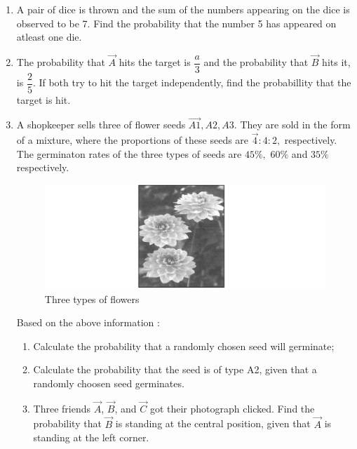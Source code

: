 \begin{enumerate}
\item A pair of dice is thrown and the sum of the numbers appearing on the dice is observed to be 7. Find the probability that the number 5 has appeared on atleast one die.
\item The probability that $\vec{A}$ hits the target is $\dfrac{a}{3}$ and the probability that $\vec{B}$ hits it, is $\dfrac{2}{5}.$ If both try to hit the target independently, find the probabillity that the target is hit. 
\item A shopkeeper sells three of flower seeds $\vec{A1},{A2},{A3}.$ They are sold in the form of a mixture, where the proportions of these seeds are $\vec{4} : {4} : {2},$ respectively. The germinaton rates of the three types of seeds are $45\%,$ $60\%$ and $35\%$ respectively.
\begin{figure}[H]                                                                                                      
\centering                                                                                                             
\includegraphics[width=\columnwidth]{figs/flowers}                                                                     
\caption{Three types of flowers}                                                                                        
\label{fig:flowers11}                                                                                      
\end{figure}
Based on  the above information :
\begin{enumerate}
\item  Calculate the probability that a randomly chosen seed will germinate;
\item  Calculate the probability  that the seed is of type A2, given that a randomly choosen seed germinates.
\item Three friends $\vec{A}$, $\vec{B}$, and $\vec{C}$ got their photograph clicked. Find the probability that $\vec{B}$ is standing at the central position, given that $\vec{A}$  is standing at the left corner.
\end{enumerate}

\end{enumerate}
